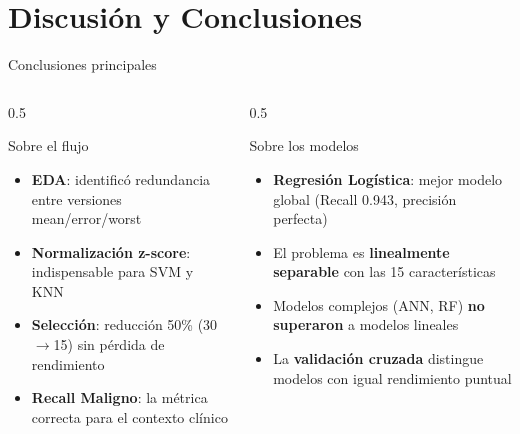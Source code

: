\documentclass[10pt,aspectratio=169]{beamer}
\begin{document}
\section{Discusión y Conclusiones}

\begin{frame}{Conclusiones principales}
\begin{columns}
\begin{column}{0.5\textwidth}
\begin{block}{Sobre el flujo}
\begin{itemize}
  \item \textbf{EDA}: identificó redundancia entre versiones mean/error/worst
  \item \textbf{Normalización z-score}: indispensable para SVM y KNN
  \item \textbf{Selección}: reducción 50\% (30$\rightarrow$15) sin pérdida de rendimiento
  \item \textbf{Recall Maligno}: la métrica correcta para el contexto clínico
\end{itemize}
\end{block}
\end{column}

\begin{column}{0.5\textwidth}
\begin{exampleblock}{Sobre los modelos}
\begin{itemize}
  \item \textbf{Regresión Logística}: mejor modelo global (Recall 0.943, precisión perfecta)
  \item El problema es \textbf{linealmente separable} con las 15 características
  \item Modelos complejos (ANN, RF) \textbf{no superaron} a modelos lineales
  \item La \textbf{validación cruzada} distingue modelos con igual rendimiento puntual
\end{itemize}
\end{exampleblock}
\end{column}
\end{columns}
\end{frame}
\end{document}
